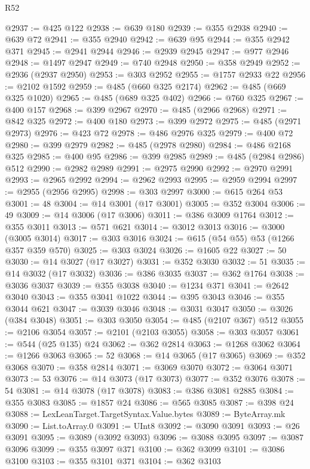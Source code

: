 \begin{lexlean}{R52}
\begin{coremodule}
@2937 := @425 @122
@2938 := @639 @180
@2939 := @355 @2938
@2940 := @639 @72
@2941 := @355 @2940
@2942 := @639 @95
@2944 := @355 @2942 @371
@2945 := @2941 @2944
@2946 := @2939 @2945
@2947 := @977 @2946
@2948 := @1497 @2947
@2949 := @740 @2948
@2950 := @358 @2949
@2952 := @2936 (@2937 @2950)
@2953 := @303 @2952
@2955 := @1757 @2933 @22
@2956 := @2102 @1592
@2959 := @485 (@660 @325 @2174)
@2962 := @485 (@669 @325 @1020)
@2965 := @485 (@689 @325 @402)
@2966 := @760 @325
@2967 := @400 @157
@2968 := @399 @2967
@2970 := @485 (@2966 @2968)
@2971 := @842 @325
@2972 := @400 @180
@2973 := @399 @2972
@2975 := @485 (@2971 @2973)
@2976 := @423 @72
@2978 := @486 @2976 @325
@2979 := @400 @72
@2980 := @399 @2979
@2982 := @485 (@2978 @2980)
@2984 := @486 @2168 @325
@2985 := @400 @95
@2986 := @399 @2985
@2989 := @485 (@2984 @2986) @512
@2990 := @2982 @2989
@2991 := @2975 @2990
@2992 := @2970 @2991
@2993 := @2965 @2992
@2994 := @2962 @2993
@2995 := @2959 @2994
@2997 := @2955 (@2956 @2995)
@2998 := @303 @2997
@3000 := @615 @264 @53
@3001 := 48
@3004 := @14 @3001 (@17 @3001)
@3005 := @352 @3004
@3006 := 49
@3009 := @14 @3006 (@17 @3006)
@3011 := @386 @3009 @1764
@3012 := @355 @3011
@3013 := @571 @621
@3014 := @3012 @3013
@3016 := @3000 (@3005 @3014)
@3017 := @303 @3016
@3024 := @615 (@54 @55) @53 (@1266 @357 @359 @570)
@3025 := @303 @3024
@3026 := @1605 @22
@3027 := 50
@3030 := @14 @3027 (@17 @3027)
@3031 := @352 @3030
@3032 := 51
@3035 := @14 @3032 (@17 @3032)
@3036 := @386 @3035
@3037 := @362 @1764
@3038 := @3036 @3037
@3039 := @355 @3038
@3040 := @1234 @371
@3041 := @2642 @3040
@3043 := @355 @3041 @1022
@3044 := @395 @3043
@3046 := @355 @3044 @621
@3047 := @3039 @3046
@3048 := @3031 @3047
@3050 := @3026 (@384 @3048)
@3051 := @303 @3050
@3054 := @485 (@2107 @367) @512
@3055 := @2106 @3054
@3057 := @2101 (@2103 @3055)
@3058 := @303 @3057
@3061 := @544 (@25 @135) @24
@3062 := @362 @2814
@3063 := @1268 @3062
@3064 := @1266 @3063
@3065 := 52
@3068 := @14 @3065 (@17 @3065)
@3069 := @352 @3068
@3070 := @358 @2814
@3071 := @3069 @3070
@3072 := @3064 @3071
@3073 := 53
@3076 := @14 @3073 (@17 @3073)
@3077 := @352 @3076
@3078 := 54
@3081 := @14 @3078 (@17 @3078)
@3083 := @386 @3081 @2885
@3084 := @355 @3083
@3085 := @1857 @24
@3086 := @565 @3085
@3087 := @398 @24
@3088 := LexLeanTarget.TargetSyntax.Value.bytes
@3089 := ByteArray.mk
@3090 := List.toArray.{0}
@3091 := UInt8
@3092 := @3090 @3091
@3093 := @26 @3091
@3095 := @3089 (@3092 @3093)
@3096 := @3088 @3095
@3097 := @3087 @3096
@3099 := @355 @3097 @371
@3100 := @362 @3099
@3101 := @3086 @3100
@3103 := @355 @3101 @371
@3104 := @362 @3103

\end{coremodule}
\end{lexlean}
